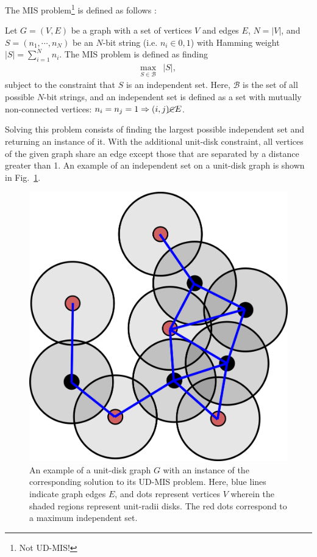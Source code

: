 \documentclass[12pt]{article}
\newenvironment{changemargin}[2]{%
\begin{list}{}{%
\setlength{\topsep}{0pt}%
\setlength{\leftmargin}{#1}%
\setlength{\rightmargin}{#2}%
\setlength{\listparindent}{\parindent}%
\setlength{\itemindent}{\parindent}%
\setlength{\parsep}{\parskip}%
}%
\item[]}{\end{list}}
\begin{document}
The MIS problem\footnote{Not UD-MIS!} is defined as follows \cite{serret_solving_2020}: \\

\begin{changemargin}{1.5cm}{1.5cm}
	\noindent Let $G = (V,E)$ be a graph with a set of vertices $V$ and edges $E$, $N = |V|$, and $S = (n_1, \dotsb, n_N)$ be an $N$-bit string (i.e. $n_i \in 0,1$) with Hamming weight $|S| = \sum_{i = 1}^N n_i$. 
	The MIS problem is defined as finding
	\begin{align*}
		\max_{S \in \mathcal{B}} & |S|,
	\end{align*}
	subject to the constraint that $S$ is an independent set.
	Here, $\mathcal{B}$ is the set of all possible $N$-bit strings, and an independent set is defined as a set with mutually non-connected vertices: $n_i = n_j = 1 \Rightarrow (i,j) \cancel{\in} E$. \\
\end{changemargin}

Solving this problem consists of finding the largest possible independent set and returning an instance of it.
With the additional unit-disk constraint, all vertices of the given graph share an edge except those that are separated by a distance greater than 1.
An example of an independent set on a unit-disk graph is shown in Fig.~\ref{fig:udmis_example}.

\begin{figure}
    \begin{center}
        \includegraphics[width=0.4\linewidth]{images/udmis_example.png}
    \end{center}
    \caption{An example of a unit-disk graph $G$ with an instance of the corresponding solution to its UD-MIS problem. Here, blue lines indicate graph edges $E$, and dots represent vertices $V$ wherein the shaded regions represent unit-radii disks. The red dots correspond to a maximum independent set.} \label{fig:udmis_example}
\end{figure}
\end{document}
